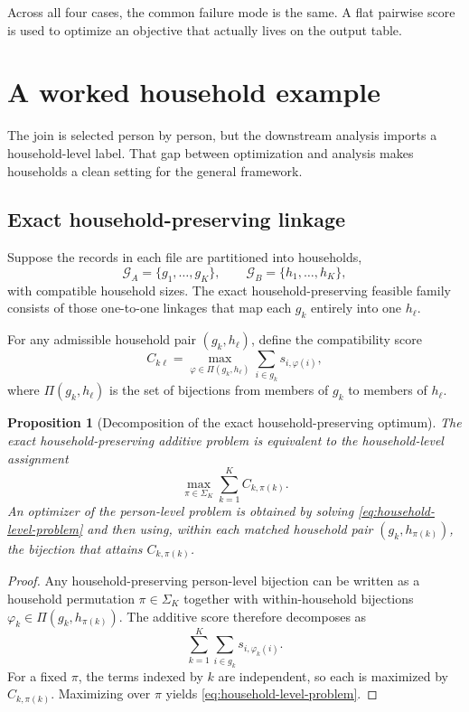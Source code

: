 \documentclass[11pt]{article}
\newtheorem{proposition}{Proposition}[section]
\theoremstyle{remark}
\begin{document}
Across all four cases, the common failure mode is the same. A flat pairwise score is used to optimize an objective that actually lives on the output table.

\section{A worked household example}
\label{sec:households}

The join is selected person by person, but the downstream analysis imports a household-level label. That gap between optimization and analysis makes households a clean setting for the general framework.

\subsection{Exact household-preserving linkage}

Suppose the records in each file are partitioned into households,
\[
\mathcal{G}_A=\{g_1,\dots,g_K\},
\qquad
\mathcal{G}_B=\{h_1,\dots,h_K\},
\]
with compatible household sizes. The exact household-preserving feasible family consists of those one-to-one linkages that map each $g_k$ entirely into one $h_\ell$.

For any admissible household pair $(g_k,h_\ell)$, define the compatibility score
\begin{equation}
C_{k\ell}
=
\max_{\varphi\in\Pi(g_k,h_\ell)}
\sum_{i\in g_k} s_{i,\varphi(i)},
\label{eq:compatibility-household}
\end{equation}
where $\Pi(g_k,h_\ell)$ is the set of bijections from members of $g_k$ to members of $h_\ell$.

\begin{proposition}[Decomposition of the exact household-preserving optimum]
\label{prop:decompose-household}
The exact household-preserving additive problem is equivalent to the household-level assignment
\begin{equation}
\max_{\pi\in\Sigma_K}
\sum_{k=1}^K C_{k,\pi(k)}.
\label{eq:household-level-problem}
\end{equation}
An optimizer of the person-level problem is obtained by solving \eqref{eq:household-level-problem} and then using, within each matched household pair $(g_k,h_{\pi(k)})$, the bijection that attains $C_{k,\pi(k)}$.
\end{proposition}

\begin{proof}
Any household-preserving person-level bijection can be written as a household permutation $\pi\in\Sigma_K$ together with within-household bijections $\varphi_k\in\Pi(g_k,h_{\pi(k)})$. The additive score therefore decomposes as
\[
\sum_{k=1}^K\sum_{i\in g_k} s_{i,\varphi_k(i)}.
\]
For a fixed $\pi$, the terms indexed by $k$ are independent, so each is maximized by $C_{k,\pi(k)}$. Maximizing over $\pi$ yields \eqref{eq:household-level-problem}.
\end{proof}
\end{document}
